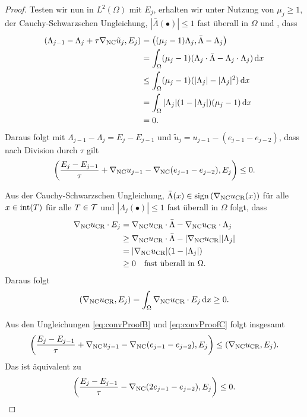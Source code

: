 \begin{proof}
  Testen wir nun  in $L^2(\Omega)$ mit $E_j$, erhalten wir 
  unter Nutzung von $\mu_j\geq 1$, der Cauchy-Schwarzschen Ungleichung,
  $\left|\bar\Lambda(\bullet)\right|\leq 1$ fast überall in $\Omega$ und
  , dass
  \begin{align*}
    \left( \Lambda_{j-1}-\Lambda_j+\tau\nabla_\textup{NC} \tilde{u}_j, E_j\right)
    &= 
    \left( (\mu_j-1)\Lambda_j,\bar\Lambda-\Lambda_j\right)\\
    &=
    \int_\Omega
    (\mu_j-1)(\Lambda_j\cdot\bar\Lambda-\Lambda_j\cdot\Lambda_j)\,\mathrm dx\\
    &\leq
    \int_\Omega (\mu_j-1)(|\Lambda_j|-|\Lambda_j|^2)\,\mathrm dx\\
    &=
    \int_\Omega |\Lambda_j| (1-|\Lambda_j|)(\mu_j-1)\,\mathrm dx \\
    &=
    0.
  \end{align*}
  Daraus folgt mit $\Lambda_{j-1}-\Lambda_j = E_j-E_{j-1}$ und $\tilde{u}_j =
  u_{j-1}-(e_{j-1}-e_{j-2})$, dass nach Division durch $\tau$ gilt
  \begin{align}
    \label{eq:convProofB}
    \left(\frac{E_j-E_{j-1}}{\tau}+ \nabla_\textup{NC} u_{j-1}-\nabla_\textup{NC}
    (e_{j-1}-e_{j-2}),E_j\right)\leq 0.
  \end{align}

  Aus der Cauchy-Schwarzschen Ungleichung,
  $\bar\Lambda(x)\in\operatorname{sign}\left(\nabla_\textup{NC}u_\textup{CR}(x)\right)$ für alle
  $x\in\operatorname{int}(T)$ für alle $T\in\mathcal{T}$ und $|\Lambda_j(\bullet)|\leq
  1$ fast überall in $\Omega$ folgt, dass
  \begin{align*}
    \nabla_\textup{NC}u_\textup{CR}\cdot E_j 
    &=
    \nabla_\textup{NC}u_\textup{CR}\cdot\bar\Lambda - \nabla_\textup{NC}u_\textup{CR}\cdot\Lambda_j\\
    &\geq 
    \nabla_\textup{NC}u_\textup{CR}\cdot\bar\Lambda - |\nabla_\textup{NC}u_\textup{CR}||\Lambda_j| \\
    &= 
    |\nabla_\textup{NC}u_\textup{CR}|(1-|\Lambda_j|)\\
    &\geq
    0\quad\text{fast überall in }\Omega.
  \end{align*}
  Daraus folgt
  \begin{align}
    \label{eq:convProofC}
    (\nabla_\textup{NC}u_\textup{CR},E_j)=\int_\Omega \nabla_\textup{NC}u_\textup{CR}\cdot E_j\,\mathrm{d}x\geq 0.
  \end{align}

  Aus den Ungleichungen \eqref{eq:convProofB} und \eqref{eq:convProofC} folgt
  insgesamt
  \begin{align*}
    \left( \frac{E_j-E_{j-1}}{\tau}+ \nabla_\textup{NC} u_{j-1}
    -\nabla_{\textup{NC}}(e_{j-1}-e_{j-2}),E_j\right)
    \leq
    (\nabla_\textup{NC}u_\textup{CR},E_j).
  \end{align*}
  Das ist äquivalent zu
  \begin{align}
    \label{eq:convProofD}
    \left( \frac{E_j-E_{j-1}}{\tau} 
    -\nabla_\textup{NC}(2e_{j-1}-e_{j-2}),E_j\right)\leq 0.
  \end{align}


\end{proof}
